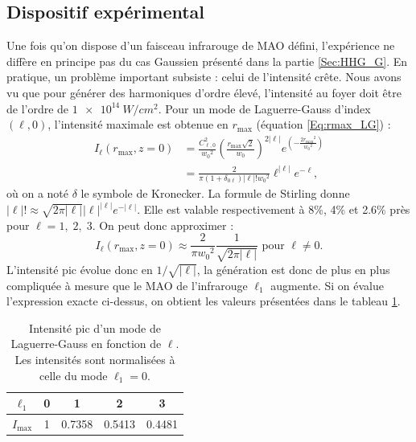 \subsection{Dispositif expérimental}
\label{sec:contraintes}
Une fois qu'on dispose d'un faisceau infrarouge de MAO défini, l'expérience ne diffère en principe pas du cas Gaussien présenté dans la partie \ref{Sec:HHG_G}. En pratique, un problème important subsiste : celui de l'intensité crête. Nous avons vu que pour générer des harmoniques d'ordre élevé, l'intensité au foyer doit être de l'ordre de $\SI{1e14}{W/cm^2}$. Pour un mode de Laguerre-Gauss d'index $(\ell,0)$, l'intensité maximale est obtenue en $r_\mathrm{max}$ (équation \ref{Eq:rmax_LG}) :
\begin{align*}
I_\ell(r_\mathrm{max},z=0) &= \frac{C_{\ell,0}^2}{{w_0}^2}{\left( {\frac{r_\mathrm{max}\sqrt{2}}{{w_0}}} \right)^{2\left| \ell  \right|}}{e^{\left( { - \frac{{2{{r_\mathrm{max}}^2}}}{{{{w_0}^2}}}} \right)}}\\
&= \frac{2}{\pi(1+\delta_{0\ell})\left| \ell  \right|!{w_0}^2}\ell^{\left| \ell  \right|}{e^{-\ell}},
\end{align*}
où on a noté $\delta$ le symbole de Kronecker. La formule de Stirling donne $\left| \ell  \right|!\approx\sqrt{2\pi\left| \ell  \right|}\left| \ell  \right|^{\left| \ell  \right|}e^{-\left| \ell  \right|}$. Elle est valable respectivement à 8\%, 4\% et 2.6\% près pour $\ell=1,\;2,\;3$. On peut donc approximer :
\begin{equation*}
I_\ell(r_\mathrm{max},z=0) \approx \frac{2}{\pi{w_0}^2}\frac{1}{\sqrt{2\pi\left| \ell  \right|}}\text{ pour }\ell\neq0. 
\end{equation*}  
L'intensité pic évolue donc en $1/\sqrt{\left| \ell  \right|}$, la génération est donc de plus en plus compliquée à mesure que le MAO de l'infrarouge $\ell_{1}$ augmente. Si on évalue l'expression exacte ci-dessus, on obtient les valeurs présentées dans le tableau \ref{tab:ipeaklg}.
\begin{table}[!ht]
\begin{center}
  \begin{tabular}{| c | c | c | c | c |}
    \hline
		$\ell_{1}$ & 0 & 1 & 2 & 3 \\ \hline
    $I_{\mathrm{max}}$ & 1 & 0.7358 & 0.5413 & 0.4481 \\ \hline
  \end{tabular}
	\caption{Intensité pic d'un mode de Laguerre-Gauss en fonction de $\ell$. Les intensités sont normalisées à celle du mode $\ell_1 = 0$.}
	\label{tab:ipeaklg}
\end{center}
\end{table}

